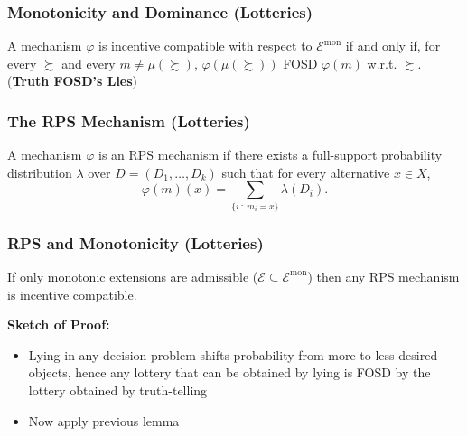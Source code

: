 
\begin{frame}
  \frametitle{Monotonicity and Dominance (Lotteries)}

\begin{lemma}
A mechanism $\varphi$ is incentive compatible with respect to $\mathcal{E}^\mathrm{mon}$ if and only if, for every $\succsim$ and every $m\neq\mu(\succsim)$, $\varphi(\mu(\succsim))$ FOSD $\varphi(m)$ w.r.t. $\succsim$. (\textbf{Truth FOSD's Lies})
\end{lemma}

\end{frame}



\begin{frame}
  \frametitle{The RPS Mechanism (Lotteries)}

\begin{definition}
  A mechanism $\varphi$ is an RPS mechanism if there exists a full-support probability distribution $\lambda$ over $D=(D_1,\ldots,D_k)$ such that for every alternative $x\in X$,
  \begin{equation*}
    \varphi(m)(x) = \sum_{\{i\ :\ m_i=x\}} \lambda(D_i).
  \end{equation*}
\end{definition}


\end{frame}

\begin{frame}
  \frametitle{RPS and Monotonicity (Lotteries)}

\begin{proposition}
If only monotonic extensions are admissible ($\mathcal{E}\subseteq \mathcal{E}^\mathrm{mon}$) then any RPS mechanism is incentive compatible.
\end{proposition}

\bigskip

\textbf{Sketch of Proof:}
\begin{itemize}
\item Lying in any decision problem shifts probability from more to less desired objects, hence any lottery that can be obtained by lying is FOSD by the lottery obtained by truth-telling

\item Now apply previous lemma
\end{itemize}

\end{frame}

